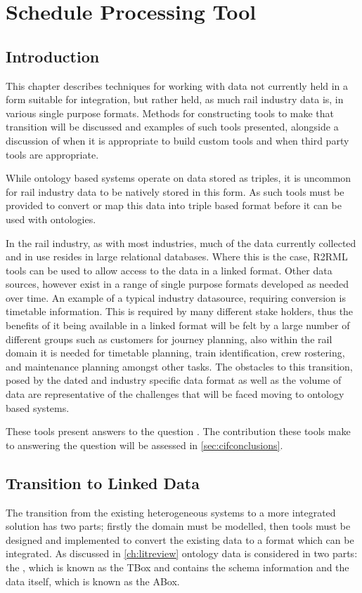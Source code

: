 \chapter{Schedule Processing Tool}\label{ch:cifparser}
 \section{Introduction}
This chapter describes techniques for working with data not currently held in a form suitable for integration, but rather held, as much rail industry data is, in various single purpose formats. Methods for constructing tools to make that transition will be discussed and examples of such tools presented, alongside a discussion of when it is appropriate to build custom tools and when third party tools are appropriate. 

While ontology based systems operate on data stored as triples, it is uncommon for rail industry data to be natively stored in this form. As such tools must be provided to convert or map this data into triple based format before it can be used with ontologies. 

In the rail industry, as with most industries, much of the data currently collected and in use resides in large relational databases. Where this is the case, R2RML tools can be used to allow access to the data in a linked format. Other data sources, however exist in a range of single purpose formats developed as needed over time. An example of a typical industry datasource, requiring conversion is timetable information. This is required by many different stake holders, thus the benefits of it being available in a linked format will be felt by a large number of different groups such as customers for journey planning, also within the rail domain it is needed for timetable planning, train identification, crew rostering, and maintenance planning amongst other tasks. The obstacles to this transition, posed by the dated and industry specific data format as well as the volume of data are representative of the challenges that will be faced moving to ontology based systems. 

These tools present answers to the question \textit{\QuestionOtherData}. The contribution these tools make to answering the question will be assessed in \autoref{sec:cifconclusions}.

\section{Transition to Linked Data}
The transition from the existing heterogeneous systems to a more integrated solution has two parts; firstly the domain must be modelled, then tools must be designed and implemented to convert the existing data to a format which can be integrated. As discussed in \autoref{ch:litreview} ontology data is considered in two parts: the , which is known as the TBox and contains the schema information and the data itself, which is known as the ABox. 

